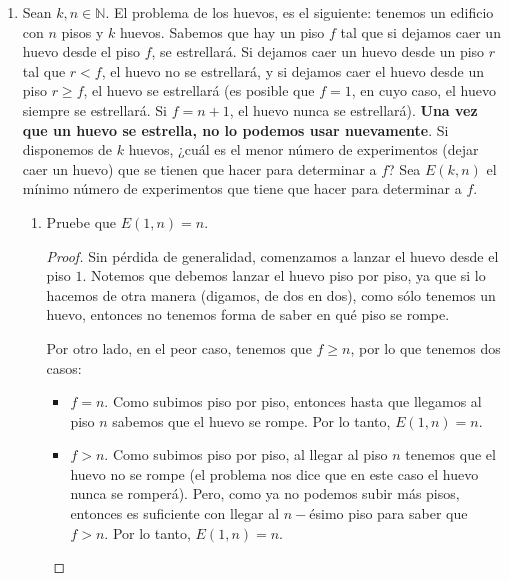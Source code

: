 \documentclass[letterpaper,11pt]{article}
\begin{document}
\begin{enumerate}
    \item Sean $k, n \in \mathbb{N}$. El problema de los huevos, es el 
    siguiente: tenemos un edificio con $n$ pisos y $k$ huevos. Sabemos que hay 
    un piso $f$ tal que si dejamos caer un huevo desde el piso $f$, se 
    estrellará. Si dejamos caer un huevo desde un piso $r$ tal que $r < f$, el 
    huevo no se estrellará, y si dejamos caer el huevo desde un piso 
    $r \geq f$, el huevo se estrellará (es posible que $f = 1$, en cuyo caso, 
    el huevo siempre se estrellará. Si $f = n+1$, el huevo nunca se estrellará).
    \textbf{Una vez que un huevo se estrella, no lo podemos usar nuevamente}. 
    Si disponemos de $k$ huevos, ¿cuál es el menor número de experimentos
    (dejar caer un huevo) que se tienen que hacer para determinar a $f$? Sea 
    $E(k, n)$ el mínimo número de experimentos que tiene que hacer para 
    determinar a $f$.
    \begin{enumerate}
        \item Pruebe que $E(1, n) = n$.
        
        \begin{proof}
            Sin pérdida de generalidad, comenzamos a lanzar el huevo desde el 
            piso $1$. Notemos que debemos lanzar el huevo piso por piso, ya que 
            si lo hacemos de otra manera (digamos, de dos en dos), como sólo 
            tenemos un huevo, entonces no tenemos forma de saber en qué piso se 
            rompe. 
            
            Por otro lado, en el peor caso, tenemos que $f \geq n$, por lo que 
            tenemos dos casos:
            \begin{itemize}
                \item $f = n$. Como subimos piso por piso, entonces hasta que 
                llegamos al piso $n$ sabemos que el huevo se rompe. Por lo 
                tanto, $E(1,n) = n$.

                \item $f > n$. Como subimos piso por piso, al llegar al piso 
                $n$ tenemos que el huevo no se rompe (el problema nos dice 
                que en este caso el huevo nunca se romperá). Pero, como ya no 
                podemos subir más pisos, entonces es suficiente con llegar al 
                $n-$ésimo piso para saber que $f > n$. Por lo tanto, 
                $E(1, n) = n$. 
            \end{itemize}
        \end{proof}


\end{enumerate}
\end{enumerate}
\end{document}
